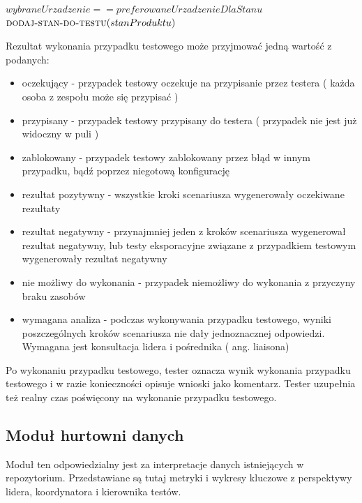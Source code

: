 	\begin{codebox}
	\li {}
	\li \Do   
	\li \Do
	     \If $wybraneUrzadzenie  ==  preferowaneUrzadzenieDlaStanu$
	\li     \Then
	           $\textnormal{\scshape dodaj-stan-do-testu}(stanProduktu)$	         	         
	        \End	        
	\li  \End	 
	\li
	  \End
	  
	\end{codebox}

Rezultat wykonania przypadku testowego może przyjmować jedną wartość z podanych:
\begin{itemize}
   \item oczekujący - przypadek testowy oczekuje na przypisanie przez testera ( każda osoba z zespołu może się przypisać )
   \item przypisany - przypadek testowy przypisany do testera ( przypadek nie jest już widoczny w puli )
   \item zablokowany - przypadek testowy zablokowany przez błąd w innym przypadku, bądź poprzez niegotową konfigurację
   \item rezultat pozytywny - wszystkie kroki scenariusza wygenerowały oczekiwane rezultaty
   \item rezultat negatywny - przynajmniej jeden z kroków scenariusza wygenerował rezultat negatywny, lub testy eksporacyjne związane z przypadkiem testowym wygenerowały rezultat negatywny
   \item nie możliwy do wykonania - przypadek niemożliwy do wykonania z przyczyny braku zasobów
   \item wymagana analiza - podczas wykonywania przypadku testowego, wyniki poszczególnych kroków scenariusza nie dały jednoznacznej odpowiedzi. Wymagana jest konsultacja lidera i pośrednika ( ang. liaisona)
 \end{itemize} 

Po wykonaniu przypadku testowego, tester oznacza wynik wykonania przypadku testowego i w razie konieczności opisuje wnioski jako komentarz. Tester uzupełnia też realny czas poświęcony na wykonanie przypadku testowego.

\subsection{ Moduł hurtowni danych  }

Moduł ten odpowiedzialny jest za interpretacje danych istniejących w repozytorium. Przedstawiane są tutaj metryki i wykresy kluczowe z perspektywy lidera, koordynatora i kierownika testów.

